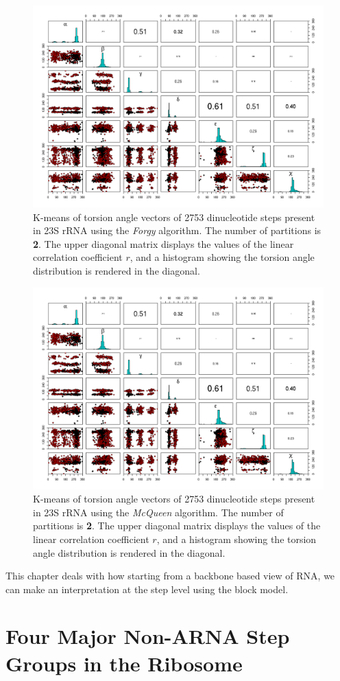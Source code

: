 \begin{figure}[htbp]
\centering
\includegraphics[angle=90, scale=0.50]{Chapter2/forgy_tor_b.png}
\caption{
K-means of torsion  angle vectors of 2753 dinucleotide steps
present in  23S rRNA using the  \textit{Forgy} algorithm.  The
number  of  partitions  is  \textbf{2}.   The  upper  diagonal  matrix
displays the values  of the linear correlation coefficient  $r$, and a
histogram showing  the torsion angle  distribution is rendered  in the
diagonal.}
\end{figure}

\begin{figure}[htbp]
\centering
\includegraphics[angle=90, scale=0.50]{Chapter2/macqueen_tor_b.png}
\caption{
K-means of torsion  angle vectors of 2753 dinucleotide steps
present in  23S rRNA using the  \textit{McQueen} algorithm.  The
number  of  partitions  is  \textbf{2}.   The  upper  diagonal  matrix
displays the values  of the linear correlation coefficient  $r$, and a
histogram showing  the torsion angle  distribution is rendered  in the
diagonal.}
\label{fig:macqueen}
\end{figure}


This chapter deals with how starting from a backbone based view of
RNA, we can make an interpretation at the step level using the block model.


\section{Four Major Non-ARNA Step Groups in the Ribosome}




